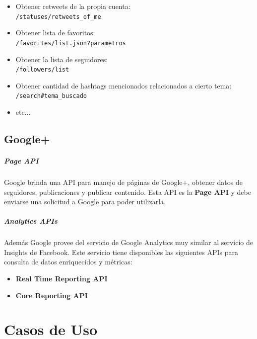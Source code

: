 \documentclass[oneside]{book}
\begin{document}
	\begin{itemize}
		\item Obtener retweets de la propia cuenta:  \\
		\texttt{/statuses/retweets\_of\_me}

		\item Obtener lista de favoritos: \\
		\texttt{/favorites/list.json?parametros}

		\item Obtener la lista de seguidores:\\
		\texttt{/followers/list}
	
		\item Obtener cantidad de hashtags mencionados relacionados a cierto tema:\\
		\texttt{/search\#tema\_buscado}
	
		\item etc...

	\end{itemize}	 

\bigskip

\subsection{Google+}

	\subparagraph*{Page API}
	Google brinda una API para manejo de páginas de Google+, obtener datos de seguidores, publicaciones y publicar contenido. Esta API es la \textbf{Page API} y debe enviarse una solicitud a Google para poder utilizarla.
	\subparagraph*{Analytics APIs}
Además Google provee del servicio de Google Analytics muy similar al servicio de Insights de Facebook. Este servicio tiene disponibles las siguientes APIs para consulta de datos enriquecidos y métricas:
	\begin{itemize}
		\item \textbf{Real Time Reporting API} 
		\item \textbf{Core Reporting API}
	\end{itemize}





\newpage


\section{Casos de Uso}
\end{document}
